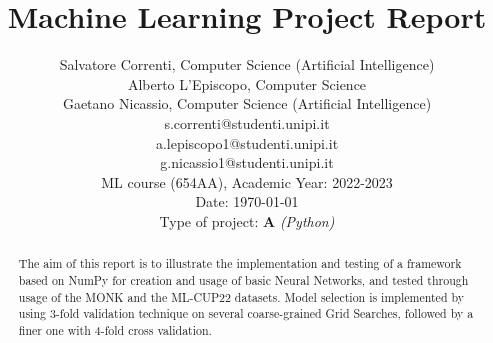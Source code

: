 \documentclass[12pt, letterpaper]{article}  %
\title{\vspace{-2cm}\textbf{Machine Learning Project Report}}
\author{\small{Salvatore Correnti, Computer Science (Artificial Intelligence)} \\
        \small{Alberto L'Episcopo, Computer Science} \\
        \small{Gaetano Nicassio, Computer Science (Artificial Intelligence)} \\
        \small{s.correnti@studenti.unipi.it} \\
        \small{a.lepiscopo1@studenti.unipi.it} \\
        \small{g.nicassio1@studenti.unipi.it} \\
        \small{ML course (654AA), Academic Year: 2022-2023} \\
        \small{Date: \today} \\
        \small{Type of project: \textbf{A} \textit{(Python)}}
}
\begin{document}
\nocite{*}  %
\date{}
\maketitle

\begin{abstract}
  The aim of this report is to illustrate the implementation and testing of a framework based on NumPy for creation and usage of basic Neural Networks, and tested through usage of the MONK and the ML-CUP22 datasets. Model selection is implemented by using 3-fold validation technique on several coarse-grained Grid Searches, followed by a finer one with 4-fold cross validation.

\end{abstract}




\end{document}
